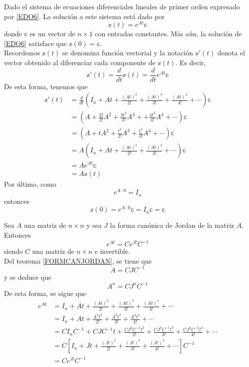 \begin{theorem}\label{theo:sol_edo}
    Dado el sistema de ecuaciones diferenciales lineales de primer orden expresado por \eqref{EDO6}. La solución a este sistema está dado por
    $$\mathbb{x}(t) = e^{At} \mathbb{c}$$
    donde $\mathbb{c}$ es un vector de $n \times 1$ con entradas constantes. Más aún, la solución de \eqref{EDO6} satisface que $\mathbb{x}(0) = \mathbb{c}$. \\
    \demostracion Recordemos $\mathbb{x}(t)$ se denomina función vectorial y la notación $\mathbb{x}'(t)$ denota el vector obtenido al diferenciar cada componente de $\mathbb{x}(t)$. Es decir,
    $$\mathbb{x}'(t) = \frac{d}{dt} \mathbb{x}(t) = \frac{d}{dt} e^{At} \mathbb{c}$$
    De esta forma, tenemos que
    \begin{align*}
        \mathbb{x}'(t) & = \frac{d}{dt} \left( I_n + At + \frac{(At)^2}{2!} + \frac{(At)^3}{3!} + \frac{(At)^4}{4!} + \cdots \right) \mathbb{c} \\
        & = \left( A + \frac{2t}{2!} A^2 + \frac{3t^2}{3!}A^3 + + \frac{4t^3}{4!}A^4 + \cdots \right) \mathbb{c} \\
        & = \left( A + tA^2 + \frac{t^2}{2!}A^3 + \frac{t^3}{3!}A^4 + \cdots \right) \mathbb{c} \\
        & = A \left( I_n + At + \frac{(At)^2}{2!} + \frac{(At)^3}{3!} + \cdots \right) \mathbb{c} \\
        & = Ae^{At} \mathbb{c} \\
        & = A \mathbb{x}(t)
    \end{align*}
    Por último, como
    $$e^{A \cdot 0} = I_n$$
    entonces
    $$\mathbb{x}(0) = e^{A \cdot 0} \mathbb{c} = I_n \mathbb{c} = \mathbb{c}$$
\end{theorem}

\newpage

\begin{theorem}
    Sea $A$ una matriz de $n \times n$ y sea $J$ la forma canónica de Jordan de la matriz $A$. Entonces
    $$e^{At} = Ce^{Jt}C^{-1}$$
    siendo $C$ una matriz de $n \times n$ e invertible. \\
    \demostracion Del teorema \ref{FORMCANJORDAN}, se tiene que
    $$A = CJC^{-1}$$
    y se deduce que
    $$A^n = CJ^nC^{-1}$$
    De esta forma, se sigue que
    \begin{align*}
        e^{At} & = I_n + At + \frac{(At)^2}{2!} + \frac{(At)^3}{3!} + \frac{(At)^4}{4!} + \cdots \\
        & = I_n + At + \frac{A^2t^2}{2!} + \frac{A^3t^3}{3!} + \frac{A^4t^4}{4!} + \cdots \\
        & = CI_nC^{-1} + CJC^{-1} t + \frac{CJ^2C^{-1} t^2}{2!} + \frac{CJ^3C^{-1} t^3}{3!} + \frac{CJ^4C^{-1} t^4}{4!} + \cdots \\
        & = C \left[ I_n + Jt + \frac{(Jt)^2}{2!} + \frac{(Jt)^3}{3!} + \frac{(Jt)^4}{4!} + \cdots \right] C^{-1} \\
        & = C e^{Jt} C^{-1}
    \end{align*}
\end{theorem}

